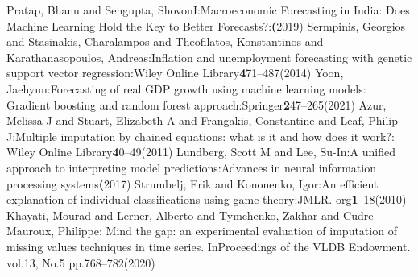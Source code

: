 \documentclass[12pt,italian, twoside]{report}
\begin{document}
\begin{thebibliography}{8}
Pratap, Bhanu and Sengupta, ShovonI:Macroeconomic Forecasting in India: Does Machine Learning Hold the Key to Better Forecasts?:\textbf(2019)
Sermpinis, Georgios and Stasinakis, Charalampos and Theofilatos, Konstantinos and Karathanasopoulos, Andreas:Inflation and unemployment forecasting with genetic support vector regression:Wiley Online Library\textbf471--487(2014)
Yoon, Jaehyun:Forecasting of real GDP growth using machine learning models: Gradient boosting and random forest approach:Springer\textbf247--265(2021)
Azur, Melissa J and Stuart, Elizabeth A and Frangakis, Constantine and Leaf, Philip J:Multiple imputation by chained equations: what is it and how does it work?: Wiley Online Library\textbf40--49(2011)
Lundberg, Scott M and Lee, Su-In:A unified approach to interpreting model predictions:Advances in neural information processing systems\textbf(2017)
Strumbelj, Erik and Kononenko, Igor:An efficient explanation of individual classifications using game theory:JMLR. org\textbf1--18(2010)
Khayati, Mourad and Lerner, Alberto and Tymchenko, Zakhar and Cudre-Mauroux, Philippe: Mind the gap: an experimental evaluation of imputation of missing values techniques in time series. InProceedings of the VLDB Endowment. vol.13, No.5 pp.768--782(2020)



\end{thebibliography}

%
%

\end{document}
